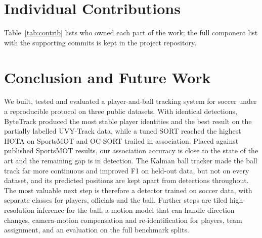 \documentclass[conference]{IEEEtran}
\begin{document}
\section{Individual Contributions}
Table~\ref{tab:contrib} lists who owned each part of the work; the full
component list with the supporting commits is kept in the project repository.

\section{Conclusion and Future Work}
We built, tested and evaluated a player-and-ball tracking system for soccer
under a reproducible protocol on three public datasets. With identical
detections, ByteTrack produced the most stable player identities and the best
result on the partially labelled UVY-Track data, while a tuned SORT reached the
highest HOTA on SportsMOT and OC-SORT trailed in association. Placed against
published SportsMOT results, our association accuracy is close to the state of
the art and the remaining gap is in detection. The Kalman ball tracker made the
ball track far more continuous and improved F1 on held-out data, but not on
every dataset, and its predicted positions are kept apart from detections
throughout. The most valuable next step is therefore a detector trained on
soccer data, with separate classes for players, officials and the ball.
Further steps are tiled high-resolution inference for the ball, a motion model
that can handle direction changes, camera-motion compensation and
re-identification for players, team assignment, and an evaluation on the full
benchmark splits.

\FloatBarrier
\end{document}
